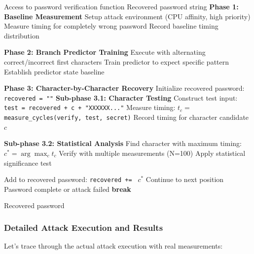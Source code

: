 \documentclass[11pt,a4paper]{article}
\theoremstyle{definition}
\begin{document}
\begin{algorithm}
\caption{Complete Simple Branch Prediction Attack}
\begin{algorithmic}[1]
\REQUIRE Access to password verification function
\ENSURE Recovered password string
\STATE \textbf{Phase 1: Baseline Measurement}
\STATE Setup attack environment (CPU affinity, high priority)
\STATE Measure timing for completely wrong password
\STATE Record baseline timing distribution

\STATE \textbf{Phase 2: Branch Predictor Training}
    \STATE Execute with alternating correct/incorrect first characters
    \STATE Train predictor to expect specific pattern
    \STATE Establish predictor state baseline
\ENDFOR

\STATE \textbf{Phase 3: Character-by-Character Recovery}
\STATE Initialize recovered password: \texttt{recovered = ""}
    \STATE \textbf{Sub-phase 3.1: Character Testing}
        \STATE Construct test input: \texttt{test = recovered + c + "XXXXXX..."}
        \STATE Measure timing: $t_c = $ \texttt{measure\_cycles(verify, test, secret)}
        \STATE Record timing for character candidate $c$
    \ENDFOR
    
    \STATE \textbf{Sub-phase 3.2: Statistical Analysis}
    \STATE Find character with maximum timing: $c^* = \arg\max_c t_c$
    \STATE Verify with multiple measurements (N=100)
    \STATE Apply statistical significance test
    
        \STATE Add to recovered password: \texttt{recovered += } $c^*$
        \STATE Continue to next position
    \ELSE
        \STATE Password complete or attack failed
        \STATE \textbf{break}
    \ENDIF
\ENDFOR

\RETURN Recovered password
\end{algorithmic}
\end{algorithm}

\subsubsection{Detailed Attack Execution and Results}

Let's trace through the actual attack execution with real measurements:
\end{document}
